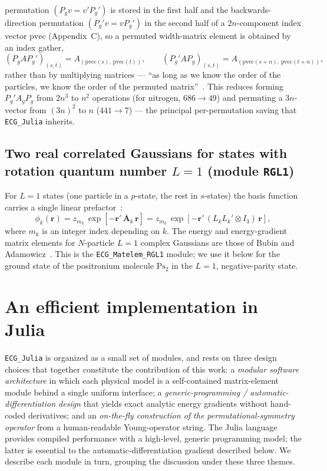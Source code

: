 \documentclass[11pt]{article}
\newcommand{\rvec}{\mathbf{r}}
\begin{document}
permutation $(P_g v = v'P_g')$ is stored in the first half and the
backwards-direction permutation $(P_g'v = vP_g')$ in the second half of a
$2n$-component index vector $\mathrm{pvec}$ (Appendix~C), so a permuted
width-matrix element is obtained by an index gather,
\begin{equation}
(P_g A P_g')_{(s,t)}=A_{(\mathrm{pvec}(s),\,\mathrm{pvec}(t))},\qquad
(P_g' A P_g)_{(s,t)}=A_{(\mathrm{pvec}(s+n),\,\mathrm{pvec}(t+n))},
\end{equation}
rather than by multiplying matrices --- ``as long as we know the order of the
particles, we know the order of the permuted matrix''~\cite{Sharkey2014}. This
reduces forming $P_g'A_gP_g$ from $2n^3$ to $n^2$ operations (for nitrogen,
$686\to49$) and permuting a $3n$-vector from $(3n)^2$ to $n$ ($441\to7$) --- the
principal per-permutation saving that \texttt{ECG\_Julia} inherits.

\subsection{Two real correlated Gaussians for states with rotation quantum number \texorpdfstring{$L=1$}{L=1} (module \texttt{RGL1})}
\label{sec:rgl1}

For $L=1$ states (one particle in a $p$-state, the rest in $s$-states) the
basis function carries a single linear prefactor~\cite{Bubin2008}:
\begin{equation}
\phi_k(\rvec)=z_{m_k}\,\exp\!\left[-\rvec'\,\overline{\mathbf{A}}_k\,\rvec\right]
=z_{m_k}\,\exp\!\left[-\rvec'\,(L_kL_k'\otimes I_3)\,\rvec\right],
\end{equation}
where $m_k$ is an integer index depending on $k$. The energy and energy-gradient
matrix elements for $N$-particle $L=1$ complex Gaussians are those of Bubin and
Adamowicz~\cite{Bubin2008}. This is the \texttt{ECG\_Matelem\_RGL1} module; we
use it below for the ground state of the positronium molecule $\mathrm{Ps_2}$
in the $L=1$, negative-parity state.

\section{An efficient implementation in Julia}
\label{sec:impl}

\texttt{ECG\_Julia} is organized as a small set of modules, and rests on three
design choices that together constitute the contribution of this work: a
\emph{modular software architecture} in which each physical model is a
self-contained matrix-element module behind a single uniform interface; a
\emph{generic-programming / automatic-differentiation design} that yields exact
analytic energy gradients without hand-coded derivatives; and an
\emph{on-the-fly construction of the permutational-symmetry operator} from a
human-readable Young-operator string. The Julia
language~\cite{Bezanson2017} provides compiled performance with a high-level,
generic programming model; the latter is essential to the
automatic-differentiation gradient described below. We describe each module in
turn, grouping the discussion under these three themes.
\end{document}
